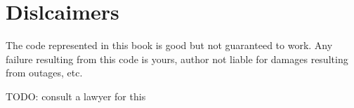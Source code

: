\chapter{Dislcaimers}
The code represented in this book is good but not guaranteed to work. Any failure resulting from this code is yours, author not liable for damages resulting from outages, etc.

TODO: consult a lawyer for this
